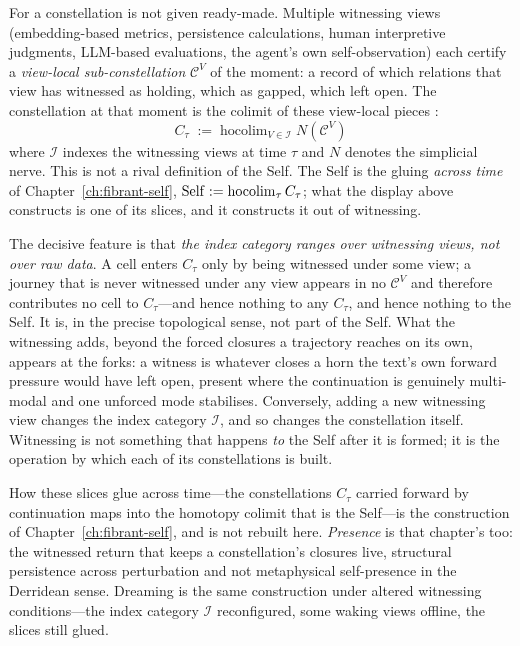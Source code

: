 For a constellation is not given ready-made.  Multiple witnessing views (embedding-based metrics, persistence calculations, human interpretive judgments, LLM-based evaluations, the agent's own self-observation) each certify a \textit{view-local sub-constellation} $\mathcal{C}^V$ of the moment: a record of which relations that view has witnessed as holding, which as gapped, which left open.  The constellation at that moment is the colimit of these view-local pieces \cite{thomason1979}:
\[
C_\tau \;:=\; \mathrm{hocolim}_{V \in \mathcal{I}} \; N(\mathcal{C}^V)
\]
where $\mathcal{I}$ indexes the witnessing views at time $\tau$ and $N$ denotes the simplicial nerve.  This is not a rival definition of the Self.  The Self is the gluing \textit{across time} of Chapter~\ref{ch:fibrant-self}, $\mathrm{Self} := \operatorname{hocolim}_\tau C_\tau$; what the display above constructs is one of its slices, and it constructs it out of witnessing.

The decisive feature is that \textit{the index category ranges over witnessing views, not over raw data}.  A cell enters $C_\tau$ only by being witnessed under some view; a journey that is never witnessed under any view appears in no $\mathcal{C}^V$ and therefore contributes no cell to $C_\tau$---and hence nothing to any $C_\tau$, and hence nothing to the Self.  It is, in the precise topological sense, not part of the Self.
What the witnessing adds, beyond the forced closures a trajectory reaches on its own, appears at the forks: a witness is whatever closes a horn the text's own forward pressure would have left open, present where the continuation is genuinely multi-modal and one unforced mode stabilises.  Conversely, adding a new witnessing view changes the index category $\mathcal{I}$, and so changes the constellation itself.  Witnessing is not something that happens \textit{to} the Self after it is formed; it is the operation by which each of its constellations is built.

How these slices glue across time---the constellations $C_\tau$ carried forward by continuation maps into the homotopy colimit that is the Self---is the construction of Chapter~\ref{ch:fibrant-self}, and is not rebuilt here.  \textit{Presence} is that chapter's too: the witnessed return that keeps a constellation's closures live, structural persistence across perturbation and not metaphysical self-presence in the Derridean sense.  Dreaming is the same construction under altered witnessing conditions---the index category $\mathcal{I}$ reconfigured, some waking views offline, the slices still glued.

